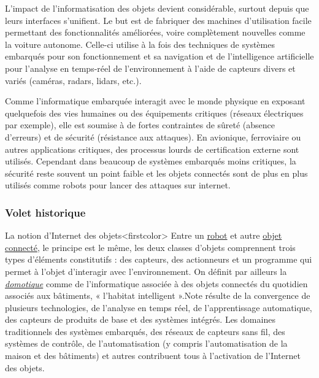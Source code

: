 \begin{tcolorbox}[title={Impacts sur les pratiques humaines}, toprule=0pt, leftrule=0pt, rightrule=0pt, arc=0pt,
                  fonttitle=\scshape\boxtitlefont,
                  colbacktitle=white, coltitle=firstcolor, colframe=firstcolor, colback=firstcolor!10,
                  breakable, enhanced jigsaw]
L’impact de l’informatisation des objets devient considérable, surtout depuis que leurs interfaces s’unifient. Le but est de fabriquer des machines d’utilisation facile permettant des fonctionnalités améliorées, voire complètement nouvelles comme la voiture autonome. Celle-ci utilise à la fois des techniques de systèmes embarqués pour son fonctionnement et sa navigation et de l’intelligence artificielle pour l’analyse en temps-réel de l’environnement à l’aide de capteurs divers et variés (caméras, radars, lidars, etc.).

Comme l’informatique embarquée interagit avec le monde physique en exposant quelquefois des vies humaines ou des équipements critiques (réseaux électriques par exemple), elle est soumise à de fortes contraintes de sûreté (absence d’erreurs) et de sécurité (résistance aux attaques). En avionique, ferroviaire ou autres applications critiques, des processus lourds de certification externe sont utilisés. Cependant dans beaucoup de systèmes embarqués moins critiques, la sécurité reste souvent un point faible et les objets connectés sont de plus en plus utilisés comme robots pour lancer des attaques sur internet.
\end{tcolorbox}

\subsubsection[Volet historique]{Volet historique}
\label{subsub:VIII.3.1.2}

La notion d'Internet des objets\caution[t]<firstcolor>{%
Entre un \href{https://fr.wikipedia.org/wiki/Robot}{robot} et autre \href{https://fr.wikipedia.org/wiki/Internet_des_objets}{objet connecté}, le principe est le même, les deux classes d'objets comprennent trois types d'éléments constitutifs : des capteurs, des actionneurs et un programme qui permet à l'objet d'interagir avec l'environnement. On définit par ailleurs la \href{https://fr.wikipedia.org/wiki/Domotique}{\emph{domotique}} comme de l’informatique associée à des objets connectés du quotidien associés aux bâtiments, « l'habitat intelligent ».}{Note}
 résulte de la convergence de plusieurs technologies, de l'analyse en temps réel, de l'apprentissage automatique, des capteurs de produits de base et des systèmes intégrés. Les domaines traditionnels des systèmes embarqués, des réseaux de capteurs sans fil, des systèmes de contrôle, de l’automatisation (y compris l’automatisation de la maison et des bâtiments) et autres contribuent tous à l'activation de l'Internet des objets.

